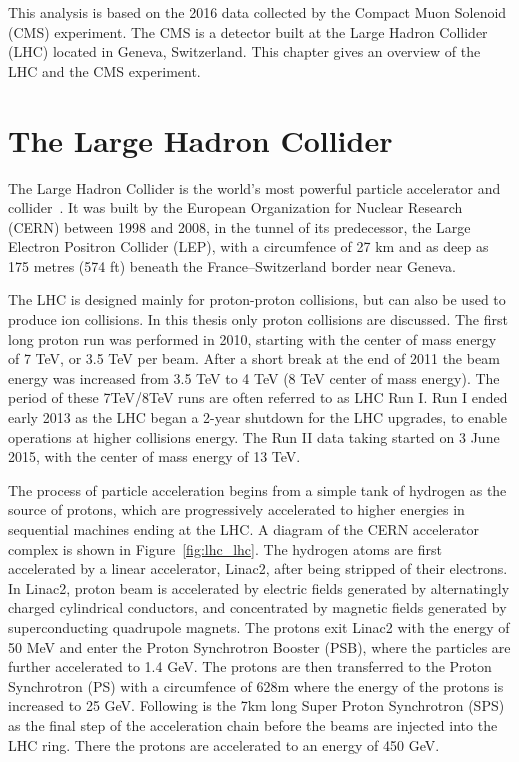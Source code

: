 
This analysis is based on the 2016 data collected by the Compact Muon Solenoid (CMS) experiment. The CMS is a detector built at the Large Hadron Collider (LHC) located in Geneva, Switzerland. This chapter gives an overview of the LHC and the CMS experiment.

\section{The Large Hadron Collider} 
The Large Hadron Collider is the world's most powerful particle accelerator and collider~\cite{lhc_lhcmachine,lhc_lhcreport}. It was built by the European Organization for Nuclear Research (CERN) between 1998 and 2008, in the tunnel of its predecessor, the Large Electron Positron Collider (LEP), with a circumfence of 27 km and as deep as 175 metres (574 ft) beneath the France–Switzerland border near Geneva. 

\vspace{0.3cm}
The LHC is designed mainly for proton-proton collisions, but can also be used to produce ion collisions. In this thesis only proton collisions are discussed. The first long proton run was performed in 2010, starting with the center of mass energy of 7 TeV, or 3.5 TeV per beam. After a short break at the end of 2011 the beam energy was increased from 3.5 TeV to 4 TeV (8 TeV center of mass energy). The period of these 7TeV/8TeV runs are often referred to as LHC Run I. Run I ended early 2013 as the LHC began a 2-year shutdown for the LHC upgrades, to enable operations at higher collisions energy. The Run II data taking started on 3 June 2015, with the center of mass energy of 13 TeV. 

\vspace{0.3cm}
The process of particle acceleration begins from a simple tank of hydrogen as the source of protons, which are progressively accelerated to higher energies in sequential machines ending at the LHC. A diagram of the CERN accelerator complex is shown in Figure~\ref{fig:lhc_lhc}. The hydrogen atoms are first accelerated by a linear accelerator, Linac2, after being stripped of their electrons. In Linac2, proton beam is accelerated by electric fields generated by alternatingly charged cylindrical conductors, and concentrated by magnetic fields generated by superconducting quadrupole magnets. The protons exit Linac2 with the energy of 50 MeV and enter the Proton Synchrotron Booster (PSB), where the particles are further accelerated to 1.4 GeV. The protons are then transferred to the Proton Synchrotron (PS) with a circumfence of 628m where the energy of the protons is increased to 25 GeV. Following is the 7km long Super Proton Synchrotron (SPS) as the final step of the acceleration chain before the beams are injected into the LHC ring. There the protons are accelerated to an energy of 450 GeV.

